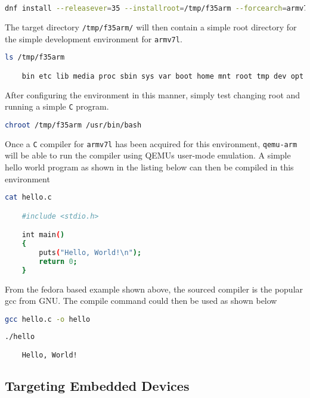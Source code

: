 \begin{lstlisting}[language=Bash]
	dnf install --releasever=35 --installroot=/tmp/f35arm --forcearch=armv7hl --repo=fedora --repo=updates systemd passwd dnf fedora-release vim-minimal m4 cmake gcc-c++ tar gcc git make tmux -y
\end{lstlisting}

The target directory \texttt{/tmp/f35arm/} will then contain a simple root directory for the simple development environment for \texttt{armv7l}.

\begin{lstlisting}[language=Bash]
	ls /tmp/f35arm

	bin etc lib media proc sbin sys var boot home mnt root tmp dev opt usr
\end{lstlisting}

After configuring the environment in this manner, simply test changing root and running a simple \texttt{C} program.

\begin{lstlisting}[language=Bash]
	chroot /tmp/f35arm /usr/bin/bash
\end{lstlisting}

Once a \texttt{C} compiler for \texttt{armv7l} has been acquired for this environment, \texttt{qemu-arm} will be able to run the compiler using QEMU\textquotesingle s user-mode emulation. A simple hello world program as shown in the listing below can then be compiled in this environment

\begin{lstlisting}[language=Bash]
	cat hello.c

	#include <stdio.h>

	int main()
	{
		puts("Hello, World!\n");
		return 0;
	}
\end{lstlisting}

From the fedora based example shown above, the sourced compiler is the popular gcc from GNU. The compile command could then be used as shown below

\begin{lstlisting}[language=Bash]
	gcc hello.c -o hello
\end{lstlisting}

\begin{lstlisting}[language=Bash]
	./hello

	Hello, World!
\end{lstlisting}


\subsection{Targeting Embedded Devices}

